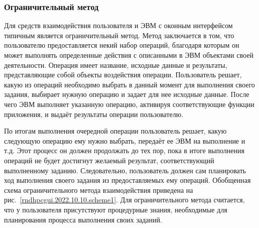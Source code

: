 \def\notedate{2022.10.10}
\def\currentauthor{Василян А.Р. (РК6-73Б)}

\subsubsection{Ограничительный метод}

	Для средств взаимодействия пользователя и ЭВМ с оконным интерфейсом типичным является ограничительный метод. Метод заключается в том, что пользователю предоставляется некий набор операций, благодаря которым он может выполнять определенные действия с описанными в ЭВМ объектами своей деятельности. Операция имеет название, исходные данные и результаты, представляющие собой объекты воздействия операции. Пользователь решает, какую из операций необходимо выбрать в данный момент для выполнения своего задания, выбирает нужную операцию и задает для нее исходные данные. После чего ЭВМ выполняет указанную операцию, активируя соответствующие функции приложения, и выдаёт результаты операции пользователю. 
	
	По итогам выполнения очередной операции пользователь решает, какую следующую операцию ему нужно выбрать, передаёт ее ЭВМ на выполнение и т.д. Этот процесс он должен продолжать до тех пор, пока в итоге выполнения операций не будет достигнут желаемый результат, соответствующий выполненному заданию. Следовательно, пользователь должен сам планировать ход выполнения своего задания из предоставляемых ему операций. Обобщенная схема ограничительного метода взаимодействия приведена на рис.~\ref{rndhpcgui.2022.10.10.scheme1}. Для ограничительного метода считается, что у пользователя присутствуют процедурные знания, необходимые для планирования процесса выполнения своих заданий.

